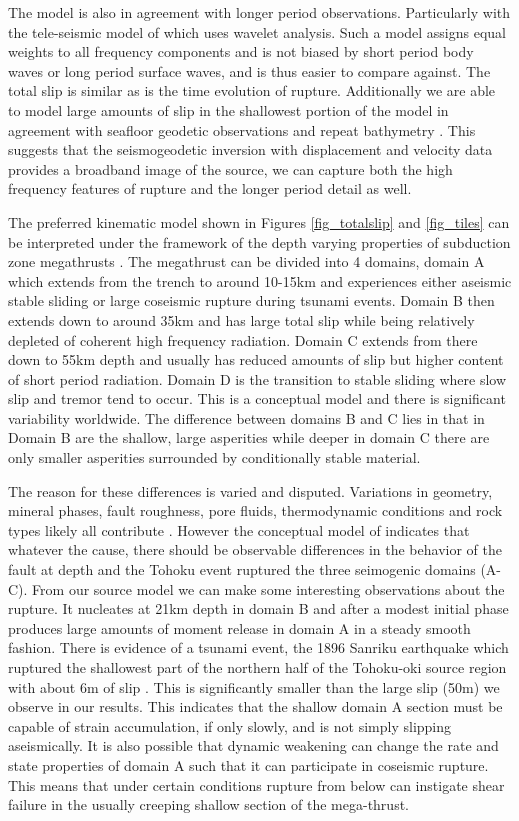 The model is also in agreement with longer period observations. Particularly with the tele-seismic model of \citet{shao2011} which uses wavelet analysis. Such a model assigns equal weights to all frequency components and is not biased by short period body waves or long period surface waves, and is thus easier to compare against. The total slip is similar as is the time evolution of rupture. Additionally we are able to model large amounts of slip in the shallowest portion of the model in agreement with seafloor geodetic observations and repeat bathymetry \citep{fujiwara2011,sato2011}. This suggests that the seismogeodetic inversion with displacement and velocity data provides a broadband image of the source, we can capture both the high frequency features of rupture and the longer period detail as well.

The preferred kinematic model shown in Figures \ref{fig_totalslip} and \ref{fig_tiles} can be interpreted under the framework of the depth varying properties of subduction zone megathrusts \citep{lay2012}. The megathrust can be divided into 4 domains, domain A which extends from the trench to around 10-15km and experiences either aseismic stable sliding or large coseismic rupture during tsunami events. Domain B then extends down to around 35km and has large total slip while being relatively depleted of coherent high frequency radiation. Domain C extends from there down to 55km depth and usually has reduced amounts of slip but higher content of short period radiation. Domain D is the transition to stable sliding where slow slip and tremor tend to occur. This is a conceptual model and there is significant variability worldwide. The difference between domains B and C lies in that in Domain B are the shallow, large asperities while deeper in domain C there are only smaller asperities surrounded by conditionally stable material.

The reason for these differences is varied and disputed. Variations in geometry, mineral phases, fault roughness, pore fluids, thermodynamic conditions and rock types likely all contribute \citep{heuret2011}. However the conceptual model of \citep{lay2012} indicates that whatever the cause, there should be observable differences in the behavior of the fault at depth and the Tohoku event ruptured the three seimogenic domains (A-C). From our source model we can make some interesting observations about the rupture. It nucleates at 21km depth in domain B and after a modest initial phase produces large amounts of moment release in domain A in a steady smooth fashion. There is evidence of a tsunami event, the 1896 Sanriku earthquake which ruptured the shallowest part of the northern half of the Tohoku-oki source region with about 6m of slip \citep{tanioka1996}. This is significantly smaller than the large slip (50m) we observe in our results. This indicates that the shallow domain A section must be capable of strain accumulation, if only slowly, and is not simply slipping aseismically. It is also possible that dynamic weakening can change the rate and state properties of domain A \citep{noda2013} such that it can participate in coseismic rupture. This means that under certain conditions rupture from below can instigate shear failure in the usually creeping shallow section of the mega-thrust.

